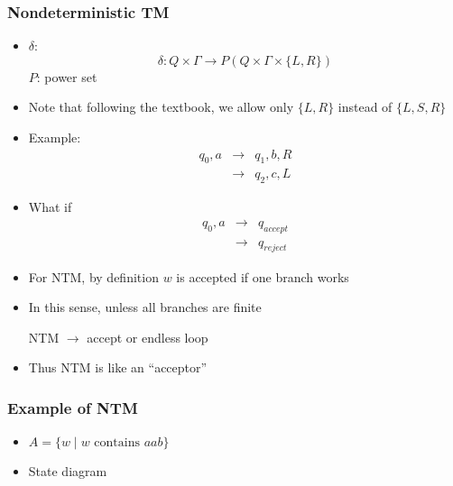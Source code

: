 




\begin{frame}[allowframebreaks] \frametitle{Nondeterministic TM}
  \begin{itemize}
\item $\delta$:
  \begin{equation*}
    \delta: Q\times \Gamma
\rightarrow P(Q\times \Gamma \times \{L,R\})
  \end{equation*}
$P$: power set
\item Note that following the textbook, we allow only
  $\{L, R\}$ instead of $\{L, S, R\}$
\item Example:
  \begin{eqnarray*}
    q_0,a & \rightarrow & q_1,b,R\\
& \rightarrow & q_2, c, L
  \end{eqnarray*}
\item What if 
  \begin{eqnarray*}
    q_0,a & \rightarrow & q_{accept} \\
& \rightarrow & q_{reject}
  \end{eqnarray*}

\item
  For NTM, by definition $w$ is accepted if one branch works

\item
  In this sense, unless all branches are finite
  \begin{center}
  NTM $\rightarrow$ accept or endless loop
\end{center}
\item
  Thus NTM is like an ``acceptor''

\end{itemize}\end{frame} \begin{frame}[allowframebreaks] \frametitle{Example of NTM}
  \begin{itemize}
\item 
$A = \{w\mid w\mbox{ contains } aab\}$
\item State diagram


\end{itemize}
\end{frame}
